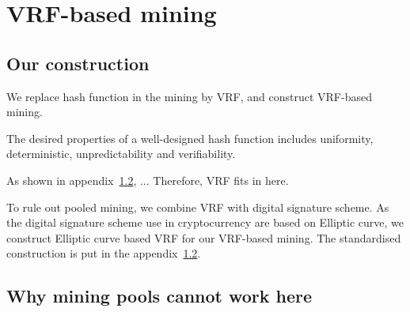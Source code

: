 \section{VRF-based mining}

\subsection{Our construction}

We replace hash function in the mining by VRF, and construct VRF-based mining.

The desired properties of a well-designed hash function includes uniformity, deterministic, unpredictability and verifiability.


As shown in appendix~\ref{}, ...
Therefore, VRF fits in here.

To rule out pooled mining, we combine VRF with digital signature scheme.
As the digital signature scheme use in cryptocurrency are based on Elliptic curve, we construct Elliptic curve based VRF for our VRF-based mining.
The standardised construction is put in the appendix~\ref{}.

\subsection{Why mining pools cannot work here}



